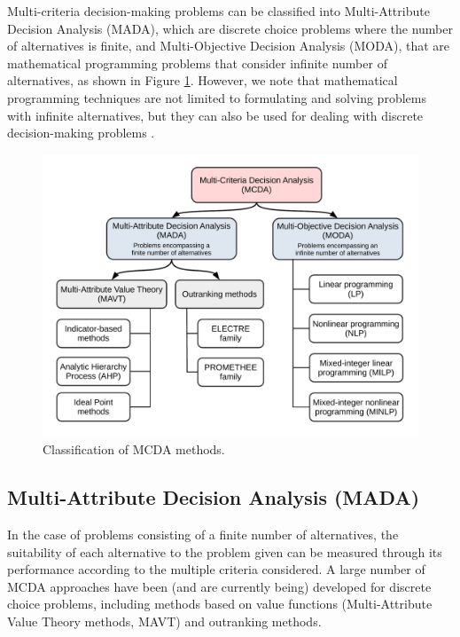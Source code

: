 \begin{refsection}[referencesCh1]
Multi-criteria decision-making problems can be classified into Multi-Attribute Decision Analysis (MADA), which are discrete choice problems where the number of alternatives is finite, and Multi-Objective Decision Analysis (MODA), that are mathematical programming problems that consider infinite number of alternatives, as shown in Figure \ref{fig:Ch1MCDA}. However, we note that mathematical programming techniques are not limited to formulating and solving problems with infinite alternatives, but they can also be used for dealing with discrete decision-making problems \citep{giove2009decision}. 

\begin{figure}[h]
	\centering
	\includegraphics[width=1\linewidth, trim={1cm 1cm 1cm 1cm},clip]{gfx/Chapter1/IntroMCDA.pdf} 
	\caption{Classification of MCDA methods.}
	\label{fig:Ch1MCDA}
\end{figure}

\subsection{Multi-Attribute Decision Analysis (MADA)}

In the case of problems consisting of a finite number of alternatives, the suitability of each alternative to the problem given can be measured through its performance according to the multiple criteria considered. A large number of MCDA approaches have been (and are currently being) developed for discrete choice problems, including methods based on value functions (Multi-Attribute Value Theory methods, MAVT) and outranking methods.


\end{refsection}
